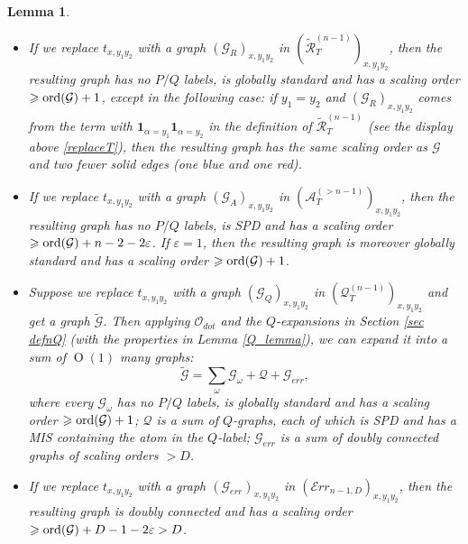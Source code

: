 \documentclass{article}
\newcommand{\1}{\mathds{1}}
\numberwithin{equation}{section}
\newcommand{\ord}{{\rm{ord}}}
\newcommand{\al}{\alpha}
\newcommand{\be}{\begin{equation}}
\newcommand{\ee}{\end{equation}}
\renewcommand{\cal}{\mathcal}
\newcommand{\wt}{\widetilde}
\renewcommand{\epsilon}{\varepsilon}
\renewcommand{\geq}{\geqslant}
\renewcommand{\ge}{\geq}
\DeclareMathOperator{\OO}{O}
\theoremstyle{plain} %
\newtheorem{lemma}[theorem]{Lemma}
\theoremstyle{remark}
\newcommand{\wtPT}{\widetilde{\mathcal R}_T}
\newcommand{\QT}{\mathcal Q_T}
\newcommand{\AT}{\mathcal A_T}
\newcommand{\Err}{{\mathcal Err}}
\begin{document}
\begin{lemma}
\begin{itemize}
\item[(2)] If we replace $t_{x,y_1y_2}$ with a graph $(\cal G_{R})_{x,y_1 y_2}$ in $(\wtPT^{(n-1)})_{x,y_1 y_2}$, then the resulting graph has no $P/Q$ labels, is globally standard and has a scaling order $\ge \ord(\cal G) +1 $, except in the following case: if $y_1=y_2$ and $(\cal G_{R})_{x,y_1 y_2}$ comes from the term with $\mathbf 1_{\al = y_1}\mathbf 1_{\al = y_2}$ in the definition of $\wtPT^{(n-1)}$ (see the display above \eqref{replaceT}), then the resulting graph has the same scaling order as $\cal G$ and two fewer solid edges (one blue and one red). %

\item[(3)] If we replace $t_{x,y_1y_2}$ with a graph $(\cal G_{A})_{x,y_1y_2}$ in $(\AT^{(>n-1)})_{x,y_1 y_2}$, then the resulting graph  has no $P/Q$ labels, is SPD and has a scaling order $\ge \ord(\cal G)+n-2-2\epsilon$. If $\epsilon=1$, then the resulting graph is moreover globally standard and has a scaling order $\ge \ord(\cal G)+1$. %

\item[(4)] Suppose we replace $t_{x,y_1y_2}$ with a graph $(\cal G_{Q})_{x,y_1y_2}$ in $(\QT^{(n-1)})_{x,y_1 y_2}$ and get a graph $\wt{ \cal G} $. Then applying $\cal O_{dot}$ and the $Q$-expansions in Section \ref{sec defnQ} (with the properties in Lemma \ref{Q_lemma}), we can expand it into a sum of $\OO(1)$ many graphs: %
\be\label{mlevelTgdef3_Q}
\wt{ \cal G} = \sum_\omega \cal G_\omega  + \cal Q   + \cal G_{err} ,
\ee
where every $\cal G_\omega$ has no $P/Q$ labels, is globally standard and has a scaling order $\ge \ord(\cal G) +1 $; %
$\cal Q$ is a sum of $Q$-graphs, each of which is SPD and has a MIS containing the atom in the $Q$-label; 
$\cal G_{err}$ is a sum of doubly connected graphs of scaling orders $> D$.

\item[(5)] If we replace $t_{x,y_1y_2}$ with a graph $(\cal G_{err})_{x,y_1y_2}$ in $(\Err_{n-1,D})_{x,y_1 y_2}$, then the resulting graph is doubly connected and has a scaling order $\ge \ord(\cal G)+D-1-2\epsilon> D$.
\end{itemize}
\end{lemma}
\end{document}
